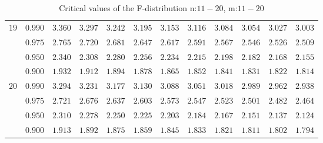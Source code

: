 \documentclass[11pt]{article}
\theoremstyle{definition}
\begin{document}
\begin{table}[H]
\begin{tabularx}{\linewidth}{c | c | c c c c c c c c c c}
		$19$ & $0.990$ & $3.360$ & $3.297$ & $3.242$ & $3.195$ & $3.153$ & $3.116$ & $3.084$ & $3.054$ & $3.027$ & $3.003$ \\
		& $0.975$ & $2.765$ & $2.720$ & $2.681$ & $2.647$ & $2.617$ & $2.591$ & $2.567$ & $2.546$ & $2.526$ & $2.509$ \\
		& $0.950$ & $2.340$ & $2.308$ & $2.280$ & $2.256$ & $2.234$ & $2.215$ & $2.198$ & $2.182$ & $2.168$ & $2.155$ \\
		& $0.900$ & $1.932$ & $1.912$ & $1.894$ & $1.878$ & $1.865$ & $1.852$ & $1.841$ & $1.831$ & $1.822$ & $1.814$ \\
		$20$ & $0.990$ & $3.294$ & $3.231$ & $3.177$ & $3.130$ & $3.088$ & $3.051$ & $3.018$ & $2.989$ & $2.962$ & $2.938$ \\
		& $0.975$ & $2.721$ & $2.676$ & $2.637$ & $2.603$ & $2.573$ & $2.547$ & $2.523$ & $2.501$ & $2.482$ & $2.464$ \\
		& $0.950$ & $2.310$ & $2.278$ & $2.250$ & $2.225$ & $2.203$ & $2.184$ & $2.167$ & $2.151$ & $2.137$ & $2.124$ \\
		& $0.900$ & $1.913$ & $1.892$ & $1.875$ & $1.859$ & $1.845$ & $1.833$ & $1.821$ & $1.811$ & $1.802$ & $1.794$
	\end{tabularx}
	\caption{Critical values of the F-distribution n:$11-20$, m:$11-20$}
\end{table}
\end{document}
